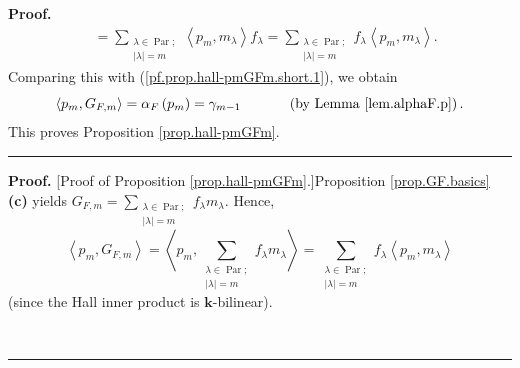 \documentclass[numbers=enddot,12pt,final,onecolumn,notitlepage]{scrartcl}%
\theoremstyle{definition}
\newenvironment{proof}[1][Proof]{\noindent\textbf{#1.} }{\ \rule{0.5em}{0.5em}}
\let\sumnonlimits\sum
\renewcommand{\sum}{\sumnonlimits\limits}
\newenvironment{verlong}{}{}
\newenvironment{vershort}{}{}
\begin{document}
\begin{vershort}
\begin{proof}
\begin{align*}
&  =\sum_{\substack{\lambda\in\operatorname*{Par};\\\left\vert \lambda
\right\vert =m}}\left\langle p_{m},m_{\lambda}\right\rangle f_{\lambda}%
=\sum_{\substack{\lambda\in\operatorname*{Par};\\\left\vert \lambda\right\vert
=m}}f_{\lambda}\left\langle p_{m},m_{\lambda}\right\rangle .
\end{align*}
Comparing this with (\ref{pf.prop.hall-pmGFm.short.1}), we obtain%
\[
\left\langle p_{m},G_{F,m}\right\rangle =\alpha_{F}\left(  p_{m}\right)
=\gamma_{m-1}\ \ \ \ \ \ \ \ \ \ \left(  \text{by Lemma \ref{lem.alphaF.p}%
}\right)  .
\]
This proves Proposition \ref{prop.hall-pmGFm}.
\end{proof}
\end{vershort}

\begin{verlong}
\begin{proof}
[Proof of Proposition \ref{prop.hall-pmGFm}.]Proposition \ref{prop.GF.basics}
\textbf{(c)} yields $G_{F,m}=\sum_{\substack{\lambda\in\operatorname*{Par}%
;\\\left\vert \lambda\right\vert =m}}f_{\lambda}m_{\lambda}$. Hence,%
\begin{equation}
\left\langle p_{m},G_{F,m}\right\rangle =\left\langle p_{m},\sum
_{\substack{\lambda\in\operatorname*{Par};\\\left\vert \lambda\right\vert
=m}}f_{\lambda}m_{\lambda}\right\rangle =\sum_{\substack{\lambda
\in\operatorname*{Par};\\\left\vert \lambda\right\vert =m}}f_{\lambda
}\left\langle p_{m},m_{\lambda}\right\rangle \label{pf.prop.hall-pmGFm.1}%
\end{equation}
(since the Hall inner product is $\mathbf{k}$-bilinear).


\end{proof}
\end{verlong}
\end{document}
